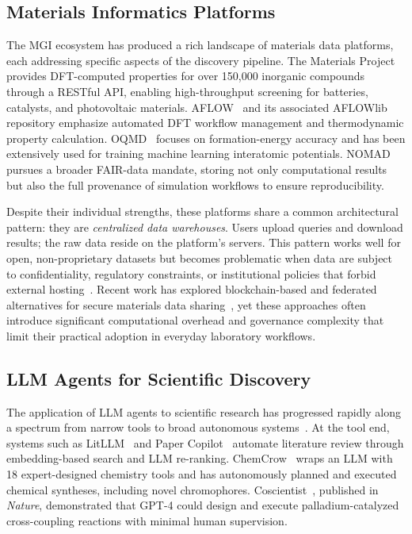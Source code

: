 \documentclass{article}
\begin{document}
\subsection{Materials Informatics Platforms}

The MGI ecosystem has produced a rich landscape of materials data platforms, each addressing specific aspects of the discovery pipeline. The Materials Project~\cite{jain2013,horton2025natmat} provides DFT-computed properties for over 150,000 inorganic compounds through a RESTful API, enabling high-throughput screening for batteries, catalysts, and photovoltaic materials. AFLOW~\cite{curtarolo2012} and its associated AFLOWlib repository emphasize automated DFT workflow management and thermodynamic property calculation. OQMD~\cite{kirklin2015} focuses on formation-energy accuracy and has been extensively used for training machine learning interatomic potentials. NOMAD~\cite{draxl2019} pursues a broader FAIR-data mandate, storing not only computational results but also the full provenance of simulation workflows to ensure reproducibility.

Despite their individual strengths, these platforms share a common architectural pattern: they are \textit{centralized data warehouses}. Users upload queries and download results; the raw data reside on the platform's servers. This pattern works well for open, non-proprietary datasets but becomes problematic when data are subject to confidentiality, regulatory constraints, or institutional policies that forbid external hosting~\cite{wilkinson2016,sears2024}. Recent work has explored blockchain-based and federated alternatives for secure materials data sharing~\cite{blockchain2024}, yet these approaches often introduce significant computational overhead and governance complexity that limit their practical adoption in everyday laboratory workflows.

\subsection{LLM Agents for Scientific Discovery}

The application of LLM agents to scientific research has progressed rapidly along a spectrum from narrow tools to broad autonomous systems~\cite{ren2025,tang2024,wei2025agentic,gridach2025survey}. At the tool end, systems such as LitLLM~\cite{agarwal2024} and Paper Copilot~\cite{lin2024} automate literature review through embedding-based search and LLM re-ranking. ChemCrow~\cite{bran2024} wraps an LLM with 18 expert-designed chemistry tools and has autonomously planned and executed chemical syntheses, including novel chromophores. Coscientist~\cite{boiko2023}, published in \textit{Nature}, demonstrated that GPT-4 could design and execute palladium-catalyzed cross-coupling reactions with minimal human supervision.
\end{document}
